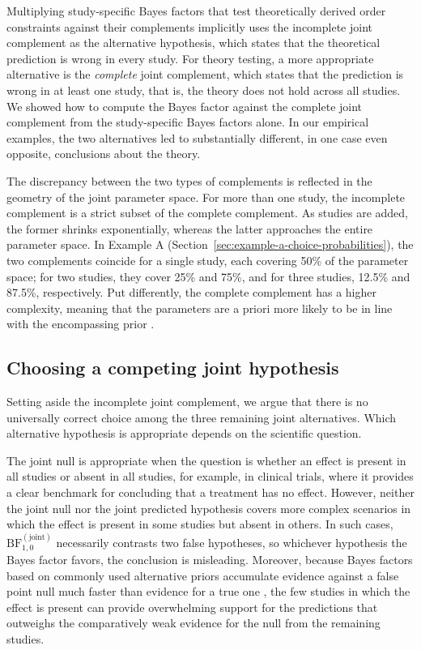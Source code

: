 \documentclass[letterpaper,11pt,oneside]{article}
\begin{document}
Multiplying study-specific Bayes factors that test theoretically derived order constraints against their complements implicitly uses the incomplete joint complement as the alternative hypothesis, which states that the theoretical prediction is wrong in every study. For theory testing, a more appropriate alternative is the \textit{complete} joint complement, which states that the prediction is wrong in at least one study, that is, the theory does not hold across all studies. We showed how to compute the Bayes factor against the complete joint complement from the study-specific Bayes factors alone. In our empirical examples, the two alternatives led to substantially different, in one case even opposite, conclusions about the theory.

The discrepancy between the two types of complements is reflected in the geometry of the joint parameter space. For more than one study, the incomplete complement is a strict subset of the complete complement. As studies are added, the former shrinks exponentially, whereas the latter approaches the entire parameter space. In Example A (Section~\ref{sec:example-a-choice-probabilities}), the two complements coincide for a single study, each covering 50\% of the parameter space; for two studies, they cover 25\% and 75\%, and for three studies, 12.5\% and 87.5\%, respectively. Put differently, the complete complement has a higher complexity, meaning that the parameters are a priori more likely to be in line with the encompassing prior \parencite{klugkistBayesFactorInequality2007}.

\subsection{Choosing a competing joint hypothesis}

Setting aside the incomplete joint complement, we argue that there is no universally correct choice among the three remaining joint alternatives. Which alternative hypothesis is appropriate depends on the scientific question.

The joint null is appropriate when the question is whether an effect is present in all studies or absent in all studies, for example, in clinical trials, where it provides a clear benchmark for concluding that a treatment has no effect. However, neither the joint null nor the joint predicted hypothesis covers more complex scenarios in which the effect is present in some studies but absent in others. In such cases, $\mathrm{BF}_{1,0}^{(\text{joint})}$ necessarily contrasts two false hypotheses, so whichever hypothesis the Bayes factor favors, the conclusion is misleading. Moreover, because Bayes factors based on commonly used alternative priors accumulate evidence against a false point null much faster than evidence for a true one \parencite{johnsonUseNonLocalPrior2010}, the few studies in which the effect is present can provide overwhelming support for the predictions that outweighs the comparatively weak evidence for the null from the remaining studies.
\end{document}
